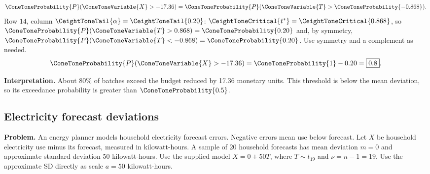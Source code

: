 \[\ConeToneProbability{P}(\ConeToneVariable{X}>-17.36)=\ConeToneProbability{P}(\ConeToneVariable{T}>\ConeToneProbability{-0.868}).\]
Row $14$, column $\CeightToneTail{\alpha}=\CeightToneTail{0.20}$: $\CeightToneCritical{t^*}=\CeightToneCritical{0.868}$, so $\ConeToneProbability{P}(\ConeToneVariable{T}>0.868)=\ConeToneProbability{0.20}$ and, by symmetry, $\ConeToneProbability{P}(\ConeToneVariable{T}<-0.868)=\ConeToneProbability{0.20}$.
Use symmetry and a complement as needed.
\[\ConeToneProbability{P}(\ConeToneVariable{X}>-17.36)=\ConeToneProbability{1}-0.20=\boxed{0.8}.\]
\begin{center}
\end{center}
\textbf{Interpretation.} About $80\%$ of batches exceed the budget reduced by 17.36 monetary units. This threshold is below the mean deviation, so its exceedance probability is greater than $\ConeToneProbability{0.5}$.


\clearpage
\subsection{Electricity forecast deviations}
\label{c8-d3}
\textbf{Problem.} An energy planner models household electricity forecast errors. Negative errors mean use below forecast. Let $X$ be household electricity use minus its forecast, measured in kilowatt-hours. A sample of 20 household forecasts has mean deviation $m=0$ and approximate standard deviation $50$ kilowatt-hours. Use the supplied model $X=0+50T$, where $T\sim t_{19}$ and $\nu=n-1=19$. Use the approximate SD directly as scale $a=50$ kilowatt-hours.
